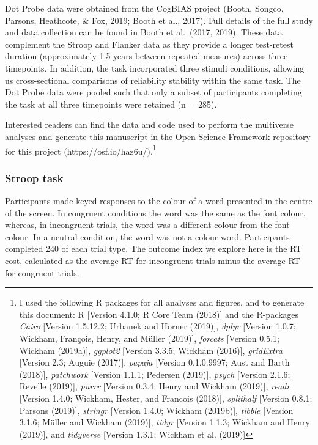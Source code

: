 \documentclass[
  english,
  man,floatsintext]{apa6}
\begin{document}
Dot Probe data were obtained from the CogBIAS project (Booth, Songco, Parsons, Heathcote, \& Fox, 2019; Booth et al., 2017). Full details of the full study and data collection can be found in Booth et al.~(2017, 2019). These data complement the Stroop and Flanker data as they provide a longer test-retest duration (approximately 1.5 years between repeated measures) across three timepoints. In addition, the task incorporated three stimuli conditions, allowing us cross-sectional comparisons of reliability stability within the same task. The Dot Probe data were pooled such that only a subset of participants completing the task at all three timepoints were retained (n = 285).

Interested readers can find the data and code used to perform the multiverse analyses and generate this manuscript in the Open Science Framework repository for this project (\url{https://osf.io/haz6u/}).\footnote{I used the following R packages for all analyses and figures, and to generate this document: R {[}Version 4.1.0; R Core Team (2018){]} and the R-packages \emph{Cairo} {[}Version 1.5.12.2; Urbanek and Horner (2019){]}, \emph{dplyr} {[}Version 1.0.7; Wickham, François, Henry, and Müller (2019){]}, \emph{forcats} {[}Version 0.5.1; Wickham (2019a){]}, \emph{ggplot2} {[}Version 3.3.5; Wickham (2016){]}, \emph{gridExtra} {[}Version 2.3; Auguie (2017){]}, \emph{papaja} {[}Version 0.1.0.9997; Aust and Barth (2018){]}, \emph{patchwork} {[}Version 1.1.1; Pedersen (2019){]}, \emph{psych} {[}Version 2.1.6; Revelle (2019){]}, \emph{purrr} {[}Version 0.3.4; Henry and Wickham (2019){]}, \emph{readr} {[}Version 1.4.0; Wickham, Hester, and Francois (2018){]}, \emph{splithalf} {[}Version 0.8.1; Parsons (2019){]}, \emph{stringr} {[}Version 1.4.0; Wickham (2019b){]}, \emph{tibble} {[}Version 3.1.6; Müller and Wickham (2019){]}, \emph{tidyr} {[}Version 1.1.3; Wickham and Henry (2019){]}, and \emph{tidyverse} {[}Version 1.3.1; Wickham et al. (2019){]}}

\hypertarget{stroop-task}{%
\subsubsection{Stroop task}\label{stroop-task}}

Participants made keyed responses to the colour of a word presented in the centre of the screen. In congruent conditions the word was the same as the font colour, whereas, in incongruent trials, the word was a different colour from the font colour. In a neutral condition, the word was not a colour word. Participants completed 240 of each trial type. The outcome index we explore here is the RT cost, calculated as the average RT for incongruent trials minus the average RT for congruent trials.
\end{document}
